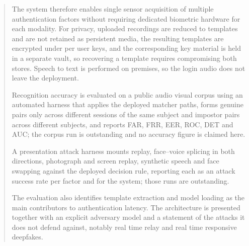 \documentclass[runningheads]{llncs}
\newif\ifresultsready
\newif\ifattacksready
\providecommand{\EvalCorpusName}{n/a}
\providecommand{\EvalGenuinePairs}{n/a}
\providecommand{\EvalImpostorPairs}{n/a}
\providecommand{\EvalFaceEER}{n/a}
\providecommand{\EvalVoiceEER}{n/a}
\providecommand{\EvalChallengeFRR}{n/a}
\begin{document}
\begin{abstract}
The system therefore enables single sensor acquisition of multiple authentication factors without requiring dedicated biometric hardware for each modality. For privacy, uploaded recordings are reduced to templates and are not retained as persistent media, the resulting templates are encrypted under per user keys, and the corresponding key material is held in a separate vault, so recovering a template requires compromising both stores. Speech to text is performed on premises, so the login audio does not leave the deployment.
%
\ifresultsready
We evaluate recognition accuracy on \EvalCorpusName, forming genuine pairs only across different sessions of the same subject (\EvalGenuinePairs{} pairs) and impostor pairs across different subjects (\EvalImpostorPairs{} pairs), and report an Equal Error Rate (EER) of \EvalFaceEER\% for the face factor and \EvalVoiceEER\% for the speaker factor, together with False Acceptance Rate (FAR) and False Rejection Rate (FRR) at the deployed operating points and the measured cost of the challenge factor's own false rejections (\EvalChallengeFRR\%).
\else
Recognition accuracy is evaluated on a public audio visual corpus using an automated harness that applies the deployed matcher paths, forms genuine pairs only across different sessions of the same subject and impostor pairs across different subjects, and reports FAR, FRR, EER, ROC, DET and AUC; the corpus run is outstanding and no accuracy figure is claimed here.
\fi
\ifattacksready
Against presentation attacks the system is evaluated directly: replay of archived recordings, face--voice splicing in both directions, photograph and screen replay, synthetic speech, and face swapping are each mounted against the deployed decision rule and reported as attack success rates, per factor and for the system as a whole.
\else
A presentation attack harness mounts replay, face--voice splicing in both directions, photograph and screen replay, synthetic speech and face swapping against the deployed decision rule, reporting each as an attack success rate per factor and for the system; those runs are outstanding.
\fi
The evaluation also identifies template extraction and model loading as the main contributors to authentication latency. The architecture is presented together with an explicit adversary model and a statement of the attacks it does not defend against, notably real time relay and real time responsive deepfakes.

\end{abstract}
\end{document}
